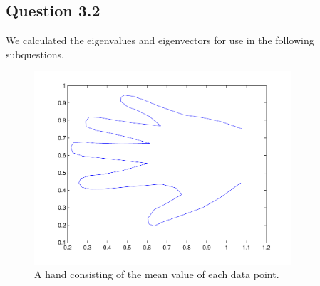 \subsection*{Question 3.2}

We calculated the eigenvalues and eigenvectors for use in the following subquestions.

\begin{figure}[!htbp]
  \centering
  \includegraphics[width=0.85\textwidth]{./images/q32_mean}
  \caption{A hand consisting of the mean value of each data point.}
  \label{fig:q32_mean}
\end{figure}

